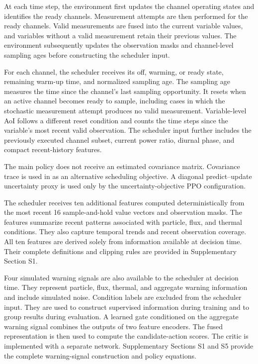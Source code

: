 At each time step, the environment first updates the channel operating states
and identifies the ready channels. Measurement attempts are then performed for
the ready channels. Valid measurements are fused into the current variable
values, and variables without a valid measurement retain their previous values.
The environment subsequently updates the observation masks and channel-level
sampling ages before constructing the scheduler input.

For each channel, the scheduler receives its off, warming, or ready state,
remaining warm-up time, and normalized sampling age. The sampling age measures
the time since the channel's last sampling opportunity. It resets when an active
channel becomes ready to sample, including cases in which the stochastic
measurement attempt produces no valid measurement. Variable-level AoI follows
a different reset condition and counts the time steps since the variable's most
recent valid observation. The scheduler input further includes the previously
executed channel subset, current power ratio, diurnal phase, and compact
recent-history features.

The main policy does not receive an estimated covariance matrix. Covariance
trace is used in  as an alternative scheduling
objective. A diagonal predict--update uncertainty proxy is used only by the
uncertainty-objective PPO configuration.

The scheduler receives ten additional features computed deterministically from
the most recent 16 sample-and-hold value vectors and observation masks. The
features summarize recent patterns associated with particle, flux, and thermal
conditions. They also capture temporal trends and recent observation coverage.
All ten features are derived solely from information available at decision
time. Their complete definitions and clipping rules are provided in
Supplementary Section S1.

Four simulated warning signals are also available to the scheduler at decision
time. They represent particle, flux, thermal, and aggregate warning information
and include simulated noise. Condition labels are excluded from the scheduler
input. They are used to construct supervised information during training and to
group results during evaluation. A learned gate conditioned on the aggregate
warning signal combines the outputs of two feature encoders. The fused
representation is then used to compute the candidate-action scores. The critic
is implemented with a separate network. Supplementary Sections S1 and S5
provide the complete warning-signal construction and policy equations.

